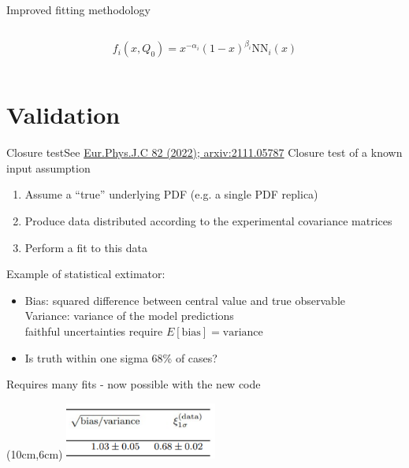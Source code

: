 \documentclass[aspectratio=169,9pt]{beamer}
\begin{document}
\begin{frame}[t]{Improved fitting methodology}
\begin{columns}[T]
\begin{column}{0.48\textwidth}
            \begin{equation*}
                f_{i}\left(x, Q_{0}\right)=x^{-\alpha_{i}}(1-x)^{\beta_{i}} \mathrm{NN}_{i}(x)
            \end{equation*}
        \end{column}
    \end{columns}
\end{frame}



\section{Validation}


\begin{frame}[t]{Closure test}{See \href{https://arxiv.org/pdf/2103.08606.pdf}{\color{blue}Eur.Phys.J.C 82 (2022); arxiv:2111.05787}}
    Closure test of a known input assumption
    \begin{enumerate}
        \item Assume a ``true'' underlying PDF (e.g. a single PDF replica)
        \item Produce data distributed according to the experimental covariance matrices
        \item Perform a fit to this data
    \end{enumerate}
    \vspace*{1em}
    Example of statistical extimator:

    \begin{itemize}
        \item Bias: squared difference between central value and true observable\\
        Variance: variance of the model predictions\\
        faithful uncertainties require $E[\textrm{bias}]=\textrm{variance}$
        \item Is truth within one sigma 68\% of cases?
    \end{itemize}
    \vspace*{1em}
    Requires many fits - now possible with the new code
    \begin{textblock*}{\textwidth}(10cm,6cm) %
        \includegraphics[width=5cm]{closure_results}
    \end{textblock*}
\end{frame}
\end{document}
